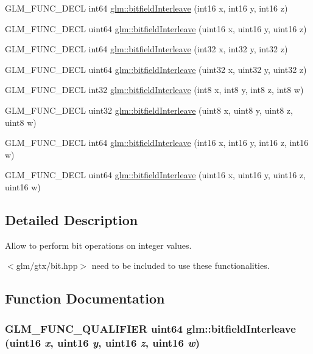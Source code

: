 \begin{CompactItemize}
\item 
GLM\_\-FUNC\_\-DECL int64 \hyperlink{group__gtx__bit_gf898f842ac089fcc8d6201c32702584a}{glm::bitfieldInterleave} (int16 x, int16 y, int16 z)
\item 
GLM\_\-FUNC\_\-DECL uint64 \hyperlink{group__gtx__bit_g3c170e2ec54f2faab5e1c5bb693d718d}{glm::bitfieldInterleave} (uint16 x, uint16 y, uint16 z)
\item 
GLM\_\-FUNC\_\-DECL int64 \hyperlink{group__gtx__bit_g64e2d84f6560af3cc639644b1e628c42}{glm::bitfieldInterleave} (int32 x, int32 y, int32 z)
\item 
GLM\_\-FUNC\_\-DECL uint64 \hyperlink{group__gtx__bit_g7c10eb37f608365cfaef5ca2c476e1ce}{glm::bitfieldInterleave} (uint32 x, uint32 y, uint32 z)
\item 
GLM\_\-FUNC\_\-DECL int32 \hyperlink{group__gtx__bit_g7da84ecc2b3a46c9c08a9f40012359cf}{glm::bitfieldInterleave} (int8 x, int8 y, int8 z, int8 w)
\item 
GLM\_\-FUNC\_\-DECL uint32 \hyperlink{group__gtx__bit_g447c0bbed9d60c14578626d8f03f3755}{glm::bitfieldInterleave} (uint8 x, uint8 y, uint8 z, uint8 w)
\item 
GLM\_\-FUNC\_\-DECL int64 \hyperlink{group__gtx__bit_g09ee0be0fac790a1607a711e597dd9bf}{glm::bitfieldInterleave} (int16 x, int16 y, int16 z, int16 w)
\item 
GLM\_\-FUNC\_\-DECL uint64 \hyperlink{group__gtx__bit_gc8a926a7bfd9b23c22a4f685193fbfe1}{glm::bitfieldInterleave} (uint16 x, uint16 y, uint16 z, uint16 w)
\end{CompactItemize}


\subsection{Detailed Description}
Allow to perform bit operations on integer values. 

$<$glm/gtx/bit.hpp$>$ need to be included to use these functionalities. 

\subsection{Function Documentation}
\hypertarget{group__gtx__bit_gc8a926a7bfd9b23c22a4f685193fbfe1}{
\subsubsection[bitfieldInterleave]{\setlength{\rightskip}{0pt plus 5cm}GLM\_\-FUNC\_\-QUALIFIER uint64 glm::bitfieldInterleave (uint16 {\em x}, \/  uint16 {\em y}, \/  uint16 {\em z}, \/  uint16 {\em w})}}
\label{group__gtx__bit_gc8a926a7bfd9b23c22a4f685193fbfe1}


